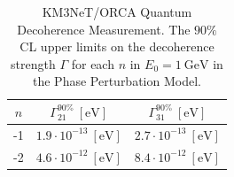 \begin{table}
\caption[KM3NeT/ORCA Quantum Decoherence Measurement (Phase Perturbation Model)]{KM3NeT/ORCA Quantum Decoherence Measurement. The $90\%$ CL upper limits on the decoherence strength $\Gamma$ for each $n$ in $E_0=1\ \mathrm{GeV}$ in the Phase Perturbation Model.}
\renewcommand{\arraystretch}{1.2}
\begin{tabular}{|c|c|c|}
\hline
$n$ & $\Gamma^{90\%}_{21}\ [\mathrm{eV}]$ & $\Gamma^{90\%}_{31}\ [\mathrm{eV}]$ \\
\hline
-1 & $1.9 \cdot 10^{-13}\ [\mathrm{eV}]$ & $2.7 \cdot 10^{-13}\ [\mathrm{eV}]$ \\
-2 & $4.6 \cdot 10^{-12}\ [\mathrm{eV}]$ & $8.4 \cdot 10^{-12}\ [\mathrm{eV}]$ \\
\hline
\end{tabular}
\end{table}